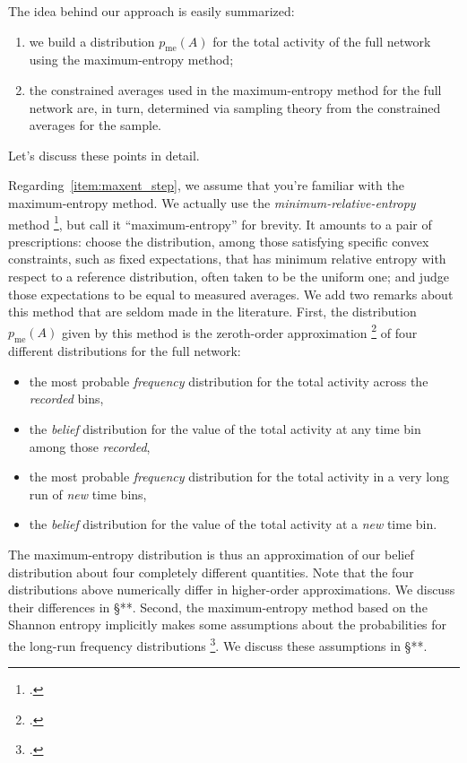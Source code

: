 \documentclass[\ifafour a4paper,12pt,\else a5paper,10pt,\fi%
onecolumn,oneside,article,%
british%
]{memoir}
\theoremstyle{remark}
\theoremstyle{innote}
\newcommand*{\citep}{\footcites}
\renewcommand*{\le}{\leqslant}%
\renewcommand*{\|}[1][]{\nonscript\,#1\vert\nonscript\;\mathopen{}}
\newcommand*{\sect}{\S}%
\newcommand*{\chap}{ch.}%
\newcommand*{\yAv}{A}
\newcommand*{\yFF}{F}
\newcommand*{\yA}{\yAv}%
\newcommand*{\yH}{\varIota}
\newcommand*{\ynuu}{\nu}
\newcommand*{\px}{p_{\text{me}}}
\begin{document}
\bigskip

The idea behind our approach is easily summarized:
\begin{enumerate}[label=(\alph*)]
  \item\label{item:maxent_step} we build a distribution $\px(\yA)$ for the total
  activity of the full network using the maximum-entropy method;
  \item\label{item:sample_step} the constrained averages used in the
  maximum-entropy method for the full network are, in turn, determined via
  sampling theory from the constrained averages for the sample.
\end{enumerate}
Let's discuss these points in detail.

Regarding~\ref{item:maxent_step}, we assume that you're familiar with the
maximum-entropy method. We actually use the \emph{minimum-relative-entropy}
method \citep{hobsonetal1973}, but call it \enquote{maximum-entropy} for
brevity. It amounts to a pair of prescriptions: choose the distribution,
among those satisfying specific convex constraints, such as fixed
expectations, that has minimum relative entropy with respect to a reference
distribution, often taken to be the uniform one; and judge those expectations
to be equal to measured averages. We add two remarks about this method that
are seldom made in the literature. First, the distribution $\px(\yA)$ given
by this method is the zeroth-order approximation \citep[in the sense of
Laplace's
method:][\chap~4]{debruijn1958_r1961}{tierneyetal1986,strawderman2000} of
four different distributions for the full network:
\begin{itemize}
\item the most probable \emph{frequency} distribution for the total
  activity across the \emph{recorded} bins, %
\item the \emph{belief} distribution for the value of the total
  activity at any time bin among those \emph{recorded},
\item the most probable \emph{frequency} distribution for the total
  activity in a very long run of \emph{new} time bins, %
\item the \emph{belief} distribution for the value of the total
  activity at a \emph{new} time bin.
\end{itemize}
The maximum-entropy distribution is thus an approximation of our belief
distribution about four completely different quantities. Note that the four
distributions above numerically differ in higher-order approximations. We
discuss their differences in \sect***. Second, the maximum-entropy method
based on the Shannon entropy implicitly makes some assumptions about the
probabilities for the long-run frequency distributions
\citep{jaynes1986d_r1996,portamana2009,portamana2017}. We discuss these
assumptions in \sect***.
\end{document}
